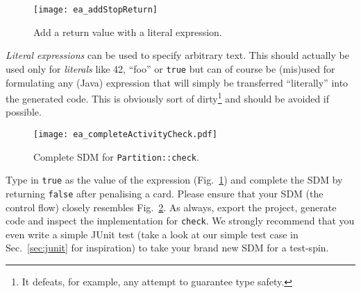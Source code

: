 \begin{figure}[htbp]
\begin{center}
  \texttt{[image: ea\_addStopReturn]}
  \caption{Add a return value with a literal expression.}
  \label{fig:sdm_check_literal_exp}
\end{center}
\end{figure}

\emph{Literal expressions} can be used to specify arbitrary text.  This should actually be used only for \emph{literals} like 42, ``foo'' or \texttt{true} but
can of course be (mis)used for formulating any (Java) expression that will simply be transferred ``literally'' into the  generated code.
This is obviously sort of dirty\footnote{It defeats, for example, any attempt to guarantee type safety.} and should be avoided if possible.

\begin{figure}[htbp]
\begin{center}
  \texttt{[image: ea\_completeActivityCheck.pdf]}
  \caption{Complete SDM for \texttt{Partition::check}.}
  \label{fig:sdm_check_finish}
\end{center}
\end{figure}

Type in \texttt{true} as the value of the expression (Fig.~\ref{fig:sdm_check_literal_exp}) and complete the SDM by returning \texttt{false} after penalising a
card.  Please ensure that your SDM (the control flow) closely resembles Fig.~\ref{fig:sdm_check_finish}.
As always, export the project, generate code and inspect the implementation for \texttt{check}.  We strongly recommend that you even write a simple JUnit test
(take a look at our simple test case in Sec.~\ref{sec:junit} for inspiration) to take your brand new SDM for a test-spin.
